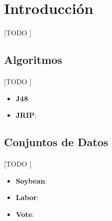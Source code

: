 \documentclass{article}
\begin{document}
	\maketitle %

	\thispagestyle{fancy} %



	\begin{abstract}
		\noindent [TODO ]
	\end{abstract}



	\section{Introducción}
	\label{sec:introducción}

		\paragraph{}
		[TODO ]

		\subsection{Algoritmos}

			\paragraph{}
			[TODO ]

			\begin{itemize}
				\item \textbf{J48}:
				\item \textbf{JRIP}:
			\end{itemize}

		\subsection{Conjuntos de Datos}

			\paragraph{}
			[TODO ]

			\begin{itemize}
				\item \textbf{Soybean}\cite{dataset:soybean}:
				\item \textbf{Labor}\cite{dataset:labor}:
				\item \textbf{Vote}\cite{dataset:vote}:
			\end{itemize}
\end{document}
